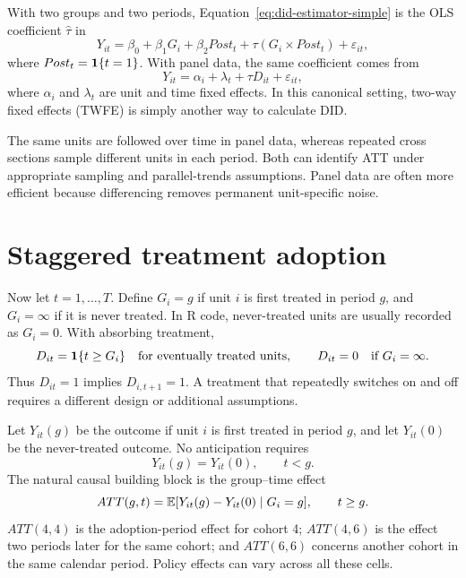With two groups and two periods, Equation~\eqref{eq:did-estimator-simple} is the
OLS coefficient $\widehat\tau$ in
\begin{equation}
  Y_{it}=\beta_0+\beta_1G_i+\beta_2Post_t
         +\tau(G_i\times Post_t)+\varepsilon_{it},
  \label{eq:did-interaction-regression}
\end{equation}
where $Post_t=\mathbf{1}\{t=1\}$.  With panel data, the same coefficient comes from
\begin{equation}
  Y_{it}=\alpha_i+\lambda_t+\tau D_{it}+\varepsilon_{it},
  \label{eq:did-twfe-simple}
\end{equation}
where $\alpha_i$ and $\lambda_t$ are unit and time fixed effects.  In this
canonical setting, two-way fixed effects (TWFE) is simply another way to
calculate DID.

The same units are followed over time in panel data, whereas repeated cross
sections sample different units in each period.  Both can identify ATT under
appropriate sampling and parallel-trends assumptions.  Panel data are often
more efficient because differencing removes permanent unit-specific noise.

\section{Staggered treatment adoption}
\label{sec:did-staggered}

Now let $t=1,\ldots,T$.  Define $G_i=g$ if unit $i$ is first treated in period
$g$, and $G_i=\infty$ if it is never treated.  In R code, never-treated units
are usually recorded as $G_i=0$.  With absorbing treatment,
\begin{equation}
  D_{it}=\mathbf{1}\{t\geq G_i\}\quad\text{for eventually treated units},
  \qquad D_{it}=0\quad\text{if }G_i=\infty.
  \label{eq:did-staggered-status}
\end{equation}
Thus $D_{it}=1$ implies $D_{i,t+1}=1$.  A treatment that repeatedly switches
on and off requires a different design or additional assumptions.

Let $Y_{it}(g)$ be the outcome if unit $i$ is first treated in period $g$, and
let $Y_{it}(0)$ be the never-treated outcome.  No anticipation requires
\begin{equation}
  Y_{it}(g)=Y_{it}(0),\qquad t<g.
  \label{eq:did-no-anticipation-staggered}
\end{equation}
The natural causal building block is the group--time effect
\begin{equation}
  ATT(g,t)=\mathbb{E}[Y_{it}(g)-Y_{it}(0)\mid G_i=g],
  \qquad t\geq g.
  \label{eq:did-att-gt}
\end{equation}
$ATT(4,4)$ is the adoption-period effect for cohort 4; $ATT(4,6)$ is the effect
two periods later for the same cohort; and $ATT(6,6)$ concerns another cohort
in the same calendar period.  Policy effects can vary across all these cells.


